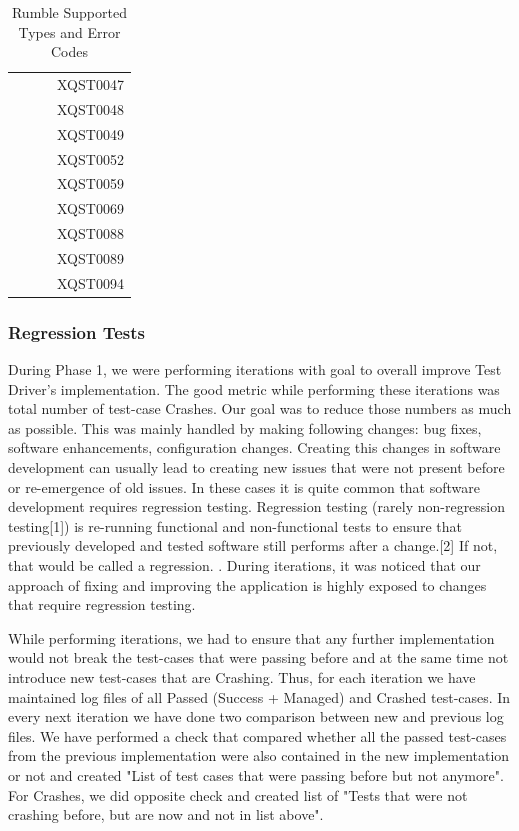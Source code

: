 \begin{table}[]
\begin{tabular}{lllr}
		&                 &  & XQST0047                                           \\
		&                 &  & XQST0048                                           \\
		&                 &  & XQST0049                                           \\
		&                 &  & XQST0052                                           \\
		&                 &  & XQST0059                                           \\
		&                 &  & XQST0069                                           \\
		&                 &  & XQST0088                                           \\
		&                 &  & XQST0089                                           \\
		&                 &  & XQST0094                                          
	\end{tabular}
	\caption{Rumble Supported Types and Error Codes}
	\label{tab:Phase2_Supported Types}
\end{table}

\subsubsection{Regression Tests}
During Phase 1, we were performing iterations with goal to overall improve Test Driver's implementation. The good metric while performing these iterations was total number of test-case Crashes. Our goal was to reduce those numbers as much as possible. This was mainly handled by making following changes: bug fixes, software enhancements, configuration changes. Creating this changes in software development can usually lead to creating new issues that were not present before or re-emergence of old issues. In these cases it is quite common that software development requires regression testing.
 Regression testing (rarely non-regression testing[1]) is re-running functional and non-functional tests to ensure that previously developed and tested software still performs after a change.[2] If not, that would be called a regression. 
. During iterations, it was noticed that our approach of fixing and improving the application is highly exposed to changes that require regression testing. 

While performing iterations, we had to ensure that any further implementation would not break the test-cases that were passing before and at the same time not introduce new test-cases that are Crashing. Thus, for each iteration we have maintained log files of all Passed (Success + Managed) and Crashed test-cases. In every next iteration we have done two comparison between new and previous log files. We have performed a check that compared whether all the passed test-cases from the previous implementation were also contained in the new implementation or not and created "List of test cases that were passing before but not anymore". For Crashes, we did opposite check and created list of "Tests that were not crashing before, but are now and not in list above". 

